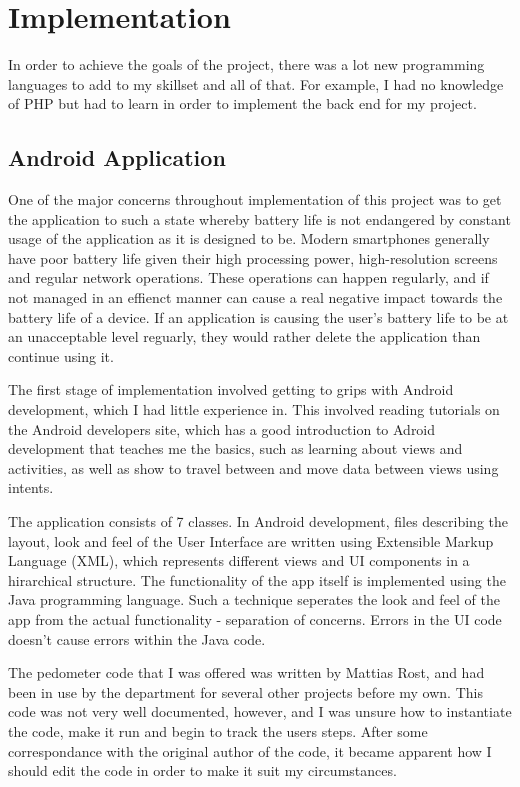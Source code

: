\documentclass{l4proj}
\begin{document}
\chapter{Implementation}

In order to achieve the goals of the project, there was a lot new programming languages to add to my skillset and all of that. For example, I had no knowledge of PHP but had to learn in order to implement the back end for my project.

\section{Android Application}

One of the major concerns throughout implementation of this project was to get the application to such a state whereby battery life is not endangered by constant usage of the application as it is designed to be. Modern smartphones generally have poor battery life given their high processing power, high-resolution screens and regular network operations. These operations can happen regularly, and if not managed in an effienct manner can cause a real negative impact towards the battery life of a device. If an application is causing the user's battery life to be at an unacceptable level reguarly, they would rather delete the application than continue using it.

The first stage of implementation involved getting to grips with Android development, which I had little experience in. This involved reading tutorials on the Android developers site, which has a good introduction to Adroid development that teaches me the basics, such as learning about views and activities, as well as show to travel between and move data between views using intents.

The application consists of 7 classes. In Android development, files describing the layout, look and feel of the User Interface are written using Extensible Markup Language (XML), which represents different views and UI components in a hirarchical structure. The functionality of the app itself is implemented using the Java programming language. Such a technique seperates the look and feel of the app from the actual functionality - separation of concerns. Errors in the UI code doesn't cause errors within the Java code.

The pedometer code that I was offered was written by Mattias Rost, and had been in use by the department for several other projects before my own. This code was not very well documented, however, and I was unsure how to instantiate the code, make it run and begin to track the users steps.  After some correspondance with the original author of the code, it became apparent how I should edit the code in order to make it suit my circumstances.
\end{document}
